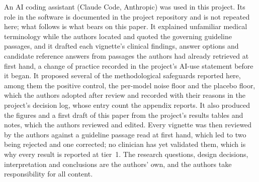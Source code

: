 \noindent An AI coding assistant (Claude Code, Anthropic) was used in this project.
Its role in the software is documented in the project repository and is not
repeated here; what follows is what bears on this paper. It explained unfamiliar
medical terminology while the authors located and quoted the governing guideline
passages, and it drafted each vignette's clinical findings, answer options and
candidate reference answers from passages the authors had already retrieved at
first hand, a change of practice recorded in the project's AI-use statement
before it began.
It proposed several of the methodological safeguards reported here, among them
the positive control, the per-model noise floor and the placebo floor, which the
authors adopted after review and recorded with their reasons in the project's
decision log, whose entry count the appendix reports. It also produced the figures and a first
draft of this paper from the project's results tables and notes, which the
authors reviewed and edited. Every vignette was then reviewed by the authors
against a guideline passage read at first hand, which led to two being rejected
and one corrected; no clinician has yet validated them, which is why every result
is reported at tier~1. The research questions, design decisions, interpretation
and conclusions are the authors' own, and the authors take responsibility for all
content.

\twocolumn
